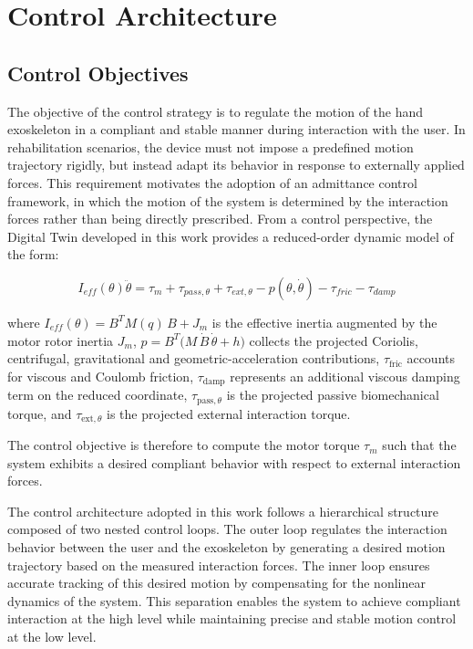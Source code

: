 \chapter{Control Architecture}
\section{Control Objectives}
The objective of the control strategy is to regulate the motion of the hand exoskeleton in a compliant and stable manner during interaction with the user. In rehabilitation scenarios, the device must not impose a predefined motion trajectory rigidly, but instead adapt its behavior in response to externally applied forces. This requirement motivates the adoption of an admittance control framework, in which the motion of the system is determined by the interaction forces rather than being directly prescribed.
From a control perspective, the Digital Twin developed in this work provides a reduced-order dynamic model of the form:

\begin{equation}
    I_{eff}(\theta)\ddot{\theta} = \tau_m + \tau_{pass,\theta} + \tau_{ext,\theta} - p(\theta, \dot{\theta}) - \tau_{fric} - \tau_{damp}
\end{equation}

where $I_{eff}(\theta) = B^T M(q)\,B + J_m$ is the effective inertia augmented by the motor rotor inertia $J_m$, $p = B^T\!\bigl(M\,\dot B\,\dot\theta + h\bigr)$ collects the projected Coriolis, centrifugal, gravitational and geometric-acceleration contributions, $\tau_{\mathrm{fric}}$ accounts for viscous and Coulomb friction, $\tau_{\mathrm{damp}}$ represents an additional viscous damping term on the reduced coordinate, $\tau_{\mathrm{pass},\theta}$ is the projected passive biomechanical torque, and $\tau_{\mathrm{ext},\theta}$ is the projected external interaction torque.

The control objective is therefore to compute the motor torque $\tau_m$ such that the system exhibits a desired compliant behavior with respect to external interaction forces.

The control architecture adopted in this work follows a hierarchical structure composed of two nested control loops. The outer loop regulates the interaction behavior between the user and the exoskeleton by generating a desired motion trajectory based on the measured interaction forces. The inner loop ensures accurate tracking of this desired motion by compensating for the nonlinear dynamics of the system. This separation enables the system to achieve compliant interaction at the high level while maintaining precise and stable motion control at the low level.

